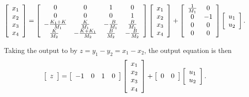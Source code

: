 \documentclass{article}
\begin{document}
\begin{align*}
\left[\begin{array}{c}
x_1 \\ x_2 \\ x_3 \\ x_4
\end{array}\right] &=
\left[\begin{array}{c c c c}
0 & 0 & 1 & 0 \\
0 & 0 & 0 & 1 \\
-\frac{K_1 + K}{M_1}
  & \frac{K}{M_1}
  & -\frac{B}{M_1}
  & \frac{B}{M_1} \\
\frac{K}{M_2} 
\  & -\frac{K + K_1}{M_2} 
  & \frac{B}{M_2}
  & -\frac{B}{M_2} 
\end{array}\right]
\left[\begin{array}{c}
x_1 \\ x_2 \\ x_3 \\ x_4
\end{array}\right]
+ \left[\begin{array}{c c}
\frac{1}{M_1} & 0 \\ 0 & -1 \\ 0 & 0 \\ 0 & 0
\end{array}\right]
\left[\begin{array}{c}
u_1 \\ u_2
\end{array}\right].
\end{align*}

Taking the output to by $z = y_1 - y_2 = x_1 - x_2$, the output equation is then
\begin{align*}
\left[\begin{array}{c}
z
\end{array}\right]
&=
\left[\begin{array}{c c c c}
-1 & 0 & 1 & 0
\end{array}\right]
\left[\begin{array}{c}
x_1 \\ x_2 \\ x_3 \\ x_4
\end{array}\right]
+
\left[\begin{array}{c c}
0 & 0
\end{array}\right]
\left[\begin{array}{c}
u_1 \\ u_2
\end{array}\right].
\end{align*}
\end{document}
